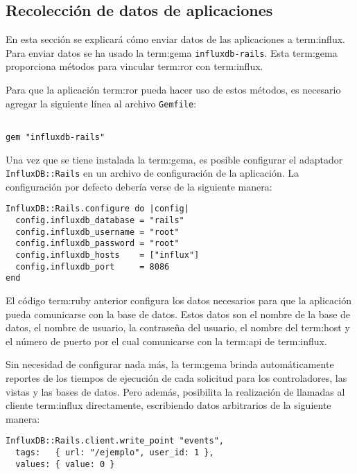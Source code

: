 \subsection{Recolección de datos de aplicaciones}
\label{aplicaciones}

En  esta sección se explicará cómo enviar datos de las aplicaciones  a
\gls{term:influx}. Para enviar datos se ha usado la \gls{term:gema}
\texttt{influxdb-rails}. Esta \gls{term:gema} proporciona métodos para vincular
\gls{term:ror} con \gls{term:influx}.

Para que la aplicación \gls{term:ror} pueda hacer uso de estos métodos, es
necesario agregar la siguiente línea al archivo \texttt{Gemfile}:

\begin{lstlisting}

gem "influxdb-rails"

\end{lstlisting}

Una vez que se tiene instalada la \gls{term:gema}, es posible configurar el
adaptador \texttt{InfluxDB::Rails} en un archivo de configuración de la
aplicación. La configuración por defecto debería verse de la siguiente manera:

\begin{lstlisting}
InfluxDB::Rails.configure do |config|
  config.influxdb_database = "rails"
  config.influxdb_username = "root"
  config.influxdb_password = "root"
  config.influxdb_hosts    = ["influx"]
  config.influxdb_port     = 8086
end
\end{lstlisting}

El código \gls{term:ruby} anterior configura los datos necesarios para que la
aplicación pueda comunicarse con la base de datos. Estos datos son el nombre de
la base de datos, el nombre de usuario, la contraseña del usuario, el nombre del
\gls{term:host} y el número de puerto por el cual comunicarse con la
\gls{term:api} de \gls{term:influx}.

Sin necesidad de configurar nada más, la \gls{term:gema} brinda automáticamente
reportes de los tiempos de ejecución de cada solicitud  para los
controladores, las vistas y las bases de datos. Pero además, posibilita la
realización de llamadas al cliente \gls{term:influx} directamente, escribiendo
datos arbitrarios de la siguiente manera:

\begin{lstlisting}
InfluxDB::Rails.client.write_point "events",
  tags:   { url: "/ejemplo", user_id: 1 },
  values: { value: 0 }
\end{lstlisting}

